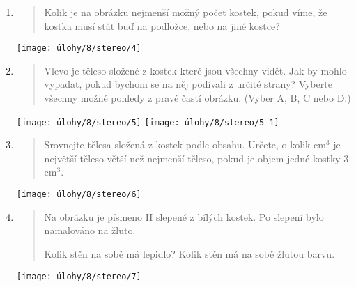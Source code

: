 \begin{enumerate}
    \item
    \begin{minipage}[t]{\linewidth}
        \begin{quote}
            Kolik je na obrázku nejmenší možný počet kostek, pokud víme, že kostka musí stát buď na podložce, nebo na jiné kostce?
        \end{quote}
        \centering
        \texttt{[image: úlohy/8/stereo/4]}
    \end{minipage}

    \item
    \begin{minipage}[t]{\linewidth}
        \begin{quote}
            Vlevo je těleso složené z kostek které jsou všechny vidět. Jak by mohlo vypadat, pokud bychom se na něj podívali z určité strany? Vyberte všechny možné pohledy z pravé častí obrázku. (Vyber A, B, C nebo D.)
        \end{quote}
        \centering

        \texttt{[image: úlohy/8/stereo/5]}
        \texttt{[image: úlohy/8/stereo/5-1]}
    \end{minipage}

    \item
    \begin{minipage}[t]{\linewidth}
        \begin{quote}
            Srovnejte tělesa složená z kostek podle obsahu. Určete, o kolik cm$^{3}$ je největší těleso větší než nejmenší těleso, pokud je objem jedné kostky 3 cm$^{3}$.
        \end{quote}
        \centering
        \texttt{[image: úlohy/8/stereo/6]}
    \end{minipage}

    \item
    \begin{minipage}[t]{\linewidth}
        \begin{quote}
            Na obrázku je písmeno H slepené z bílých kostek. Po slepení bylo namalováno na žluto.

            Kolik stěn na sobě má lepidlo? Kolik stěn má na sobě žlutou barvu.
        \end{quote}
        \centering
        \texttt{[image: úlohy/8/stereo/7]}
    \end{minipage}


\end{enumerate}
